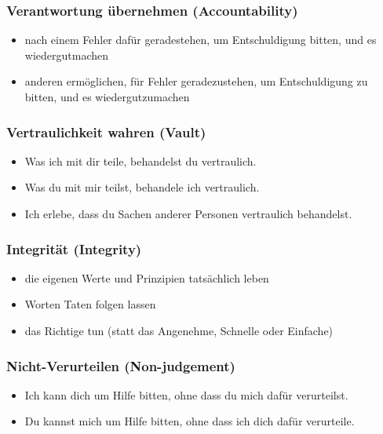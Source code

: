 \subsubsection{Verantwortung übernehmen (Accountability)}

\begin{itemize}
  \item nach einem Fehler dafür geradestehen, um Entschuldigung bitten, und es wiedergutmachen
  \item anderen ermöglichen, für Fehler geradezustehen, um Entschuldigung zu bitten, und es wiedergutzumachen
\end{itemize}


\subsubsection{Vertraulichkeit wahren (Vault)}

\begin{itemize}
  \item \glqq Was ich mit dir teile, behandelst du vertraulich.\grqq
  \item \glqq Was du mit mir teilst, behandele ich vertraulich.\grqq
  \item \glqq Ich erlebe, dass du Sachen anderer Personen vertraulich behandelst.\grqq
\end{itemize}


\subsubsection{Integrität (Integrity)}

\begin{itemize}
  \item die eigenen Werte und Prinzipien tatsächlich leben
  \item Worten Taten folgen lassen
  \item das Richtige tun (statt das Angenehme, Schnelle oder Einfache)
\end{itemize}


\subsubsection{Nicht-Verurteilen (Non-judgement)}

\begin{itemize}
  \item \glqq Ich kann dich um Hilfe bitten, ohne dass du mich dafür verurteilst.\grqq
  \item \glqq Du kannst mich um Hilfe bitten, ohne dass ich dich dafür verurteile.\grqq
\end{itemize}


